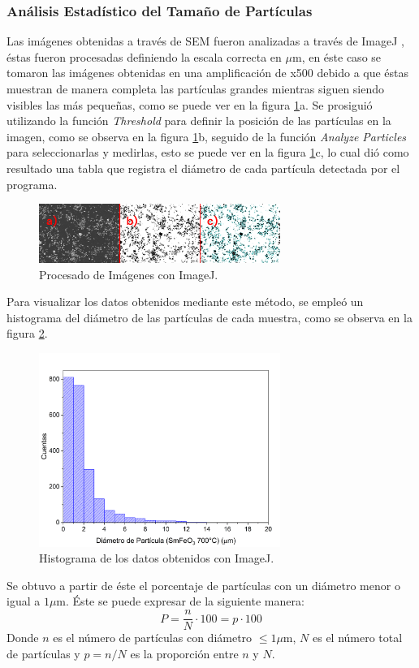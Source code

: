 \documentclass[../main.tex]{subfiles}
\begin{document}
\subsubsection{Análisis Estadístico del Tamaño de Partículas}
Las imágenes obtenidas a través de SEM fueron analizadas a través de ImageJ \cite{ImageJ}, éstas fueron procesadas definiendo la escala correcta en $\mu$m, en éste caso se tomaron las imágenes obtenidas en una amplificación de x500 debido a que éstas muestran de manera completa las partículas grandes mientras siguen siendo visibles las más pequeñas, como se puede ver en la figura \ref{fig:imgjcomp}a. Se prosiguió utilizando la función \textit{Threshold} para definir la posición de las partículas en la imagen, como se observa en la figura \ref{fig:imgjcomp}b, seguido de la función \textit{Analyze Particles} para seleccionarlas y medirlas, esto se puede ver en la figura \ref{fig:imgjcomp}c, lo cual dió como resultado una tabla que registra el diámetro de cada partícula detectada por el programa.
\begin{figure}[H]
    \centering
    \includegraphics[width=0.7\textwidth]{fig/imagejcomp.png}
    \caption{Procesado de Imágenes con ImageJ.}
    \label{fig:imgjcomp}
\end{figure}
Para visualizar los datos obtenidos mediante este método, se empleó un histograma del diámetro de las partículas de cada muestra, como se observa en la figura \ref{fig:ejemplohist}.
\begin{figure}[H]
    \centering
    \includegraphics[width=0.7\textwidth]{fig/ejemplohist.png}
    \caption{Histograma de los datos obtenidos con ImageJ.}
    \label{fig:ejemplohist}
\end{figure}
Se obtuvo a partir de éste el porcentaje de partículas con un diámetro menor o igual a $1\mu$m. Éste se puede expresar de la siguiente manera:
\begin{equation}
    P=\dfrac{n}{N}\cdot100=p\cdot100
    \label{eq:porcentajeeq}
\end{equation}
Donde $n$ es el número de partículas con diámetro $\leq 1\mu$m, $N$ es el número total de partículas y $p=n/N$ es la proporción entre $n$ y $N$.
\end{document}
